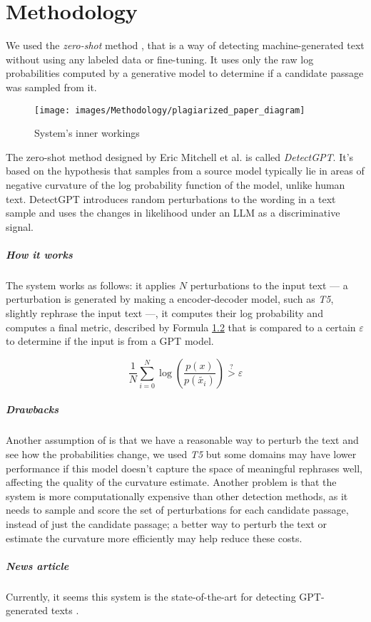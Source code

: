 \chapter{Methodology}

We used the \textit{zero-shot} method \cite{mitchell2023detectgpt}, that is  a way of detecting machine-generated text without using any labeled data or fine-tuning. It uses only the raw log probabilities computed by a generative model to determine if a candidate passage was sampled from it.

\begin{figure}[H]
	\centering
	\texttt{[image: images/Methodology/plagiarized\_paper\_diagram]}
	\caption{System's inner workings}
	\label{fig:plagiarizedpaperdiagram}
\end{figure}

The zero-shot method designed by Eric Mitchell et al. is called \textit{DetectGPT}. It's based on the hypothesis that samples from a source model typically lie in areas of negative curvature of the log probability function of the model, unlike human text. DetectGPT introduces random perturbations to the wording in a text sample and uses the changes in likelihood under an LLM as a discriminative signal.

\paragraph{How it works}
The system works as follows: it applies $N$ perturbations to the input text --- a perturbation is generated by making a encoder-decoder model, such as \textit{T5}, slightly rephrase the input text ---, it computes their log probability and computes a final metric, described by Formula \ref{formula:logprobmetric} that is compared to a certain $\varepsilon$ to determine if the input is from a GPT model.

\begin{figure}[H]
	\centering
	\label{formula:logprobmetric}
	\begin{equation}
		\dfrac{1}{N} \sum_{i = 0}^{N}
		\log\left(
		\dfrac{p(x)}{p(\tilde{x_i})}
		\right)
		\stackrel{?}{>}
		\varepsilon
	\end{equation}
\end{figure}

\paragraph{Drawbacks}
Another assumption of is that we have a reasonable way to perturb the text and see how the probabilities change, we used \textit{T5} but some domains may have lower performance if this model doesn't capture the space of meaningful rephrases well, affecting the quality of the curvature estimate. Another problem is that the system is more computationally expensive than other detection methods, as it needs to sample and score the set of perturbations for each candidate passage, instead of just the candidate passage; a better way to perturb the text or estimate the curvature more efficiently may help reduce these costs.

\paragraph{News article}
Currently, it seems this system is the state-of-the-art for detecting GPT-generated texts \cite{state-of-the-art-article}.
